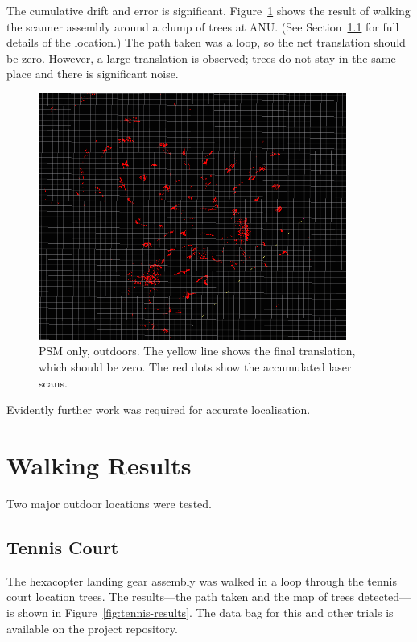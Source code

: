 \documentclass[12pt,oneside,a4paper]{book}
\begin{document}
The cumulative drift and error is
significant. Figure~\ref{fig:psm-outdoor} shows the result of walking
the scanner assembly around a clump of trees at ANU. (See
Section~\ref{sec:tennis-court} for full details of the location.) The
path taken was a loop, so the net translation should be zero. However, a
large translation is observed; trees do not stay in the same place and
there is significant noise.

\begin{figure}
  \centering
  \includegraphics[width=0.9\textwidth]{figs/psm-outdoor}
  \caption{PSM only, outdoors. The yellow line shows the final
    translation, which should be zero. The red dots show the
    accumulated laser scans.}
  \label{fig:psm-outdoor}
\end{figure}

Evidently further work was required for accurate localisation.
\newpage
\section{Walking Results}
\label{sec:tree-based-local}

Two major outdoor locations were tested.

\subsection{Tennis Court}
\label{sec:tennis-court}

The hexacopter landing gear assembly was walked in a loop through the
tennis court location trees. The results---the path taken and the map of trees
detected---is shown in Figure~\ref{fig:tennis-results}. The data bag
for this and other trials is available on the project repository.
\end{document}
